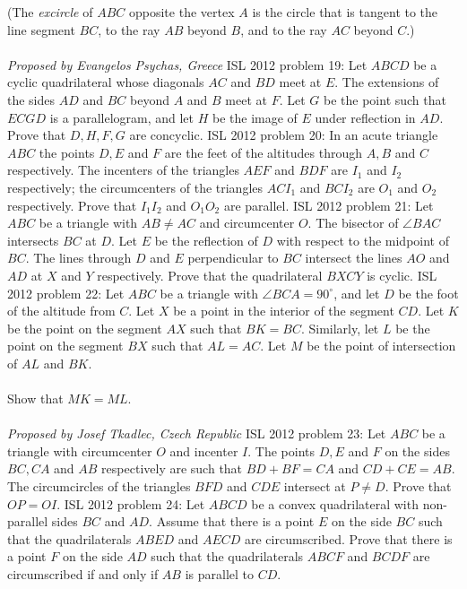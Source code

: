 (The \textit{excircle} of $ABC$ opposite the vertex $A$ is the circle that is tangent to the line segment $BC$, to the ray $AB$ beyond $B$, and to the ray $AC$ beyond $C$.) \\\\
\textit{Proposed by Evangelos Psychas, Greece} 
ISL 2012 problem 19:  Let $ABCD$ be a cyclic quadrilateral whose diagonals $AC$ and $BD$ meet at $E$. The extensions of the sides $AD$ and $BC$ beyond $A$ and $B$ meet at $F$. Let $G$ be the point such that $ECGD$ is a parallelogram, and let $H$ be the image of $E$ under reflection in $AD$. Prove that $D,H,F,G$ are concyclic. 
ISL 2012 problem 20:  In an acute triangle $ABC$ the points $D,E$ and $F$ are the feet of the altitudes through $A,B$ and $C$ respectively. The incenters of the triangles $AEF$ and $BDF$ are $I_1$ and $I_2$ respectively; the circumcenters of the triangles $ACI_1$ and $BCI_2$ are $O_1$ and $O_2$ respectively. Prove that $I_1I_2$ and $O_1O_2$ are parallel. 
ISL 2012 problem 21:  Let $ABC$ be a triangle with $AB \neq AC$ and circumcenter $O$. The bisector of $\angle BAC$ intersects $BC$ at $D$. Let $E$ be the reflection of $D$ with respect to the midpoint of $BC$. The lines through $D$ and $E$ perpendicular to $BC$ intersect the lines $AO$ and $AD$ at $X$ and $Y$ respectively. Prove that the quadrilateral $BXCY$ is cyclic. 
ISL 2012 problem 22:  Let $ABC$ be a triangle with $\angle BCA=90^{\circ}$, and let $D$ be the foot of the altitude from $C$. Let $X$ be a point in the interior of the segment $CD$. Let $K$ be the point on the segment $AX$ such that $BK=BC$. Similarly, let $L$ be the point on the segment $BX$ such that $AL=AC$. Let $M$ be the point of intersection of $AL$ and $BK$. \\\\
Show that $MK=ML$. \\\\
\textit{Proposed by Josef Tkadlec, Czech Republic} 
ISL 2012 problem 23:  Let $ABC$ be a triangle with circumcenter $O$ and incenter $I$. The points $D,E$ and $F$ on the sides $BC,CA$ and $AB$ respectively are such that $BD+BF=CA$ and $CD+CE=AB$. The circumcircles of the triangles $BFD$ and $CDE$ intersect at $P \neq D$. Prove that $OP=OI$. 
ISL 2012 problem 24:  Let $ABCD$ be a convex quadrilateral with non-parallel sides $BC$ and $AD$. Assume that there is a point $E$ on the side $BC$ such that the quadrilaterals $ABED$ and $AECD$ are circumscribed. Prove that there is a point $F$ on the side $AD$ such that the quadrilaterals $ABCF$ and $BCDF$ are circumscribed if and only if $AB$ is parallel to $CD$. 
